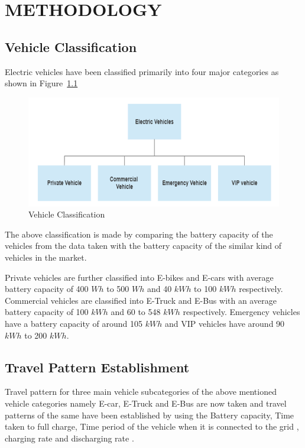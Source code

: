 	\chapter{METHODOLOGY}
	\label{chap:methodology}
	
	\section{Vehicle Classification}
	
	 Electric vehicles have been classified primarily into four major categories as shown in Figure~\ref{fig:classification} 
	 	
			\begin{figure}[h]
				\centering
				\includegraphics[width=0.7\linewidth]{./Figures/classification}
				\caption{Vehicle Classification}
				\label{fig:classification}
			\end{figure}
		
	The above classification is made by comparing the battery capacity of the vehicles from the data taken with the battery capacity of the similar kind of vehicles in the market.

	\par {Private vehicles are further classified into E-bikes and E-cars with average battery capacity of 400 $Wh$ to 500 $Wh$ and 40 $kWh$ to 100 $kWh$ respectively. Commercial vehicles are classified into E-Truck and E-Bus with an average battery capacity of 100 $kWh$ and 60 to 548 $kWh$ respectively. Emergency vehicles have a battery capacity of around 105 $kWh$ and VIP vehicles have around 90 $kWh$ to 200 $kWh$.
	}
	
	\section{Travel Pattern Establishment}
	
	Travel pattern for three main vehicle subcategories of the above mentioned vehicle categories namely E-car, E-Truck and E-Bus are now taken and travel patterns of the same have been established by using the Battery capacity, Time taken to full charge, Time period of the vehicle when it is connected to the grid , charging rate and discharging rate \cite{evdata}.
	
